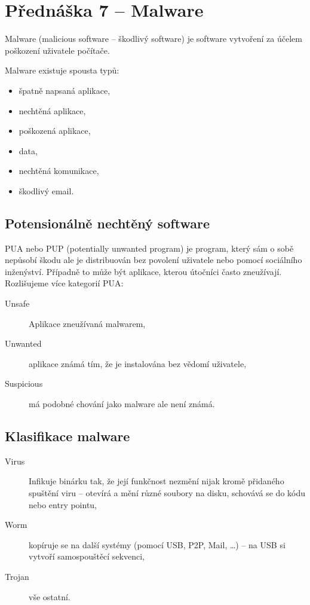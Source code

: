\section{Přednáška 7 -- Malware}

Malware (malicious software -- škodlivý software) je software vytvoření za účelem poškození uživatele počítače.

Malware existuje spousta typů:

\begin{itemize}
    \item špatně napsaná aplikace,
    \item nechtěná aplikace,
    \item poškozená aplikace,
    \item data,
    \item nechtěná komunikace,
    \item škodlivý email.
\end{itemize}

\subsection*{Potensionálně nechtěný software}

PUA nebo PUP (potentially unwanted program) je program, který sám o sobě nepůsobí škodu ale je distribuován bez povolení uživatele nebo pomocí sociálního inženýství.
Případně to může být aplikace, kterou útočníci často zneužívají.
Rozlišujeme více kategorií PUA:

\begin{description}
    \item[Unsafe] Aplikace zneužívaná malwarem,
    \item[Unwanted] aplikace známá tím, že je instalována bez vědomí uživatele,
    \item[Suspicious] má podobné chování jako malware ale není známá.  
\end{description}

\subsection*{Klasifikace malware}

\begin{description}
    \item[Virus] Infikuje binárku tak, že její funkčnost nezmění nijak kromě přidaného spuštění viru -- otevírá a mění různé soubory na disku, schovává se do kódu nebo entry pointu,
    \item[Worm] kopíruje se na další systémy (pomocí USB, P2P, Mail, \dots) -- na USB si vytvoří samospouštěcí sekvenci,
    \item[Trojan] vše ostatní.
\end{description}

